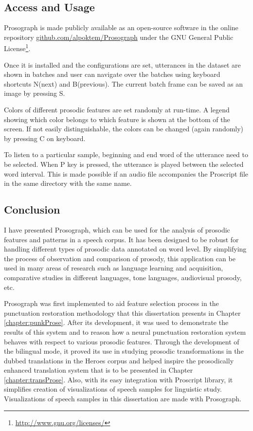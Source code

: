 \subsection{Access and Usage}
Prosograph is made publicly available as an open-source software in the online repository \url{github.com/alpoktem/Prosograph} under the GNU General Public License\footnote{\url{http://www.gnu.org/licenses/}}. 

Once it is installed and the configurations are set, utterances in the dataset are shown in batches and user can navigate over the batches using keyboard shortcuts N(next) and B(previous). The current batch frame can be saved as an image by pressing S. 


Colors of different prosodic features are set randomly at run-time. A legend showing which color belongs to which feature is shown at the bottom of the screen. If not easily distinguishable, the colors can be changed (again randomly) by pressing C on keyboard. 

To listen to a particular sample, beginning and end word of the utterance need to be selected. When P key is pressed, the utterance is played between the selected word interval. This is made possible if an audio file accompanies the Proscript file in the same directory with the same name. 

\subsection{Conclusion}
I have presented Prosograph, which can be used for the analysis of prosodic features and patterns in a speech corpus. It has been designed to be robust for handling different types of prosodic data annotated on word level. By simplifying the process of observation and comparison of prosody, this application can be used in many areas of research such as language learning and acquisition, comparative studies in different languages, tone languages, audiovisual prosody, etc.

Prosograph was first implemented to aid feature selection process in the punctuation restoration methodology that this dissertation presents in Chapter \ref{chapter:punkProse}. After its development, it was used to demonstrate the results of this system and to reason how a neural punctuation restoration system behaves with respect to various prosodic features. Through the development of the bilingual mode, it proved its use in studying prosodic transformations in the dubbed translations in the Heroes corpus and helped inspire the prosodically enhanced translation system that is to be presented in Chapter \ref{chapter:transProse}. Also, with its easy integration with Proscript library, it simplifies creation of visualizations of speech samples for linguistic study. Visualizations of speech samples in this dissertation are made with Prosograph. 

